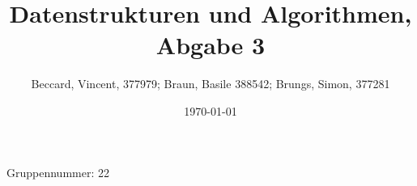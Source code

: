 \documentclass{article}
\title{Datenstrukturen und Algorithmen, Abgabe 3}
\author{Beccard, Vincent, 377979; Braun, Basile 388542; Brungs, Simon, 377281}
\date{\today}
\begin{document}
\noindent
Gruppennummer: 22%
\begingroup
\let\newpage\relax%
\maketitle
\endgroup
\renewcommand{\thesubsection}{\alph{subsection}}




\end{document}
